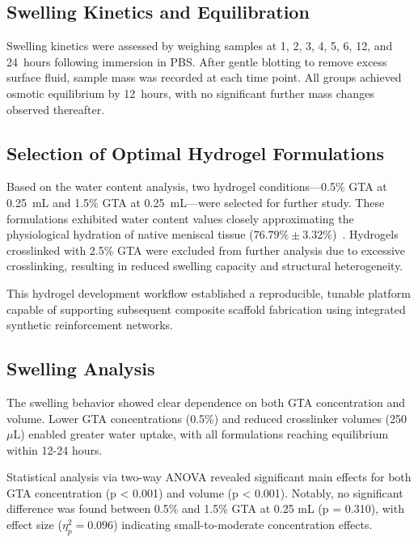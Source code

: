 \subsection{Swelling Kinetics and Equilibration}

Swelling kinetics were assessed by weighing samples at 1, 2, 3, 4, 5, 6, 12, and 24~hours following immersion in PBS. After gentle blotting to remove excess surface fluid, sample mass was recorded at each time point. All groups achieved osmotic equilibrium by 12~hours, with no significant further mass changes observed thereafter.

\subsection{Selection of Optimal Hydrogel Formulations}

Based on the water content analysis, two hydrogel conditions—0.5\% GTA at 0.25~mL and 1.5\% GTA at 0.25~mL—were selected for further study. These formulations exhibited water content values closely approximating the physiological hydration of native meniscal tissue (\(76.79\% \pm 3.32\%\))~\cite{morejon2020compressiveproperties}. Hydrogels crosslinked with 2.5\% GTA were excluded from further analysis due to excessive crosslinking, resulting in reduced swelling capacity and structural heterogeneity.



This hydrogel development workflow established a reproducible, tunable platform capable of supporting subsequent composite scaffold fabrication using integrated synthetic reinforcement networks.

\subsection{Swelling Analysis}

The swelling behavior showed clear dependence on both GTA concentration and volume. Lower GTA concentrations (0.5\%) and reduced crosslinker volumes (250 \(\mu\)L) enabled greater water uptake, with all formulations reaching equilibrium within 12-24 hours.

Statistical analysis via two-way ANOVA revealed significant main effects for both GTA concentration (p < 0.001) and volume (p < 0.001). Notably, no significant difference was found between 0.5\% and 1.5\% GTA at 0.25 mL (p = 0.310), with effect size (\(\eta_p^2 = 0.096\)) indicating small-to-moderate concentration effects.

